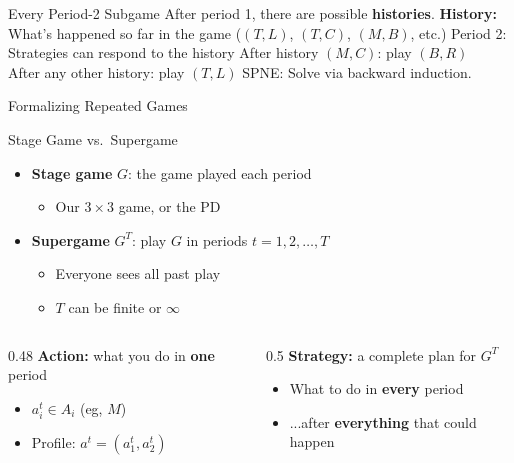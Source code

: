 \begin{frame}{Every Period-2 Subgame}
After period 1, there are \underline{\hspace{0.3in}} possible \textbf{histories}.
\bsk
\textbf{History:} What's happened so far in the game ($(T,L)$, $(T,C)$, $(M,B)$, etc.)
\bsk
Period 2: Strategies can respond to the history
\bsk
After history $(M,C)$: play $(B,R)$\\
After any other history: play $(T,L)$
\bsk
SPNE: Solve via backward induction.
\bsk
{}
\vspace{-0.3in}
\end{frame}


\begin{frame}[standout]
Formalizing Repeated Games
\end{frame}

\begin{frame}{Stage Game vs.\ Supergame}
\begin{itemize}
    \item \textbf{Stage game} $G$: the game played each period
    \begin{itemize}
        \item Our $3\times 3$ game, or the PD
    \end{itemize}
    \item \textbf{Supergame} $G^T$: play $G$ in periods $t=1,2,\dots,T$
    \begin{itemize}
        \item Everyone sees all past play
        \item $T$ can be finite or $\infty$
    \end{itemize}
\end{itemize}
\bsk
\begin{columns}[T]
\begin{column}{0.48\textwidth}
\textbf{Action:} what you do in \textbf{one} period
\begin{itemize}
    \item $a_i^t\in A_i$ (eg, $M$)
    \item Profile: $a^t=(a_1^t,a_2^t)$
\end{itemize}
\end{column}
\begin{column}{0.5\textwidth}
\textbf{Strategy:} a complete plan for $G^T$
\begin{itemize}
    \item What to do in \textbf{every} period
    \item ...after \textbf{everything} that could happen
\end{itemize}
\end{column}
\end{columns}
\vspace{-0.3in}
\end{frame}

